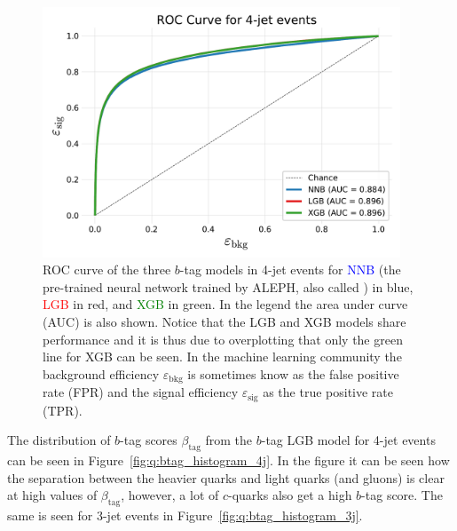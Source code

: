 \begin{figure}[h!]
  \centerfloat
  \includegraphics[width=0.95\textwidth, trim=10 10 10 40, clip]{figures/quarks/ROC_4_jet-down_sample=1.00-ML_vars=vertex-selection=b-ejet_min=4-n_iter_RS_lgb=99-n_iter_RS_xgb=9-cdot_cut=0.90-version=19.pdf}
  \caption[ROC curve for 4-jet $b$-tagging]
          {ROC curve of the three $b$-tag models in 4-jet events for \textcolor{blue}{NNB} (the pre-trained neural network trained by ALEPH, also called ) in blue, \textcolor{red}{LGB} in red, and \textcolor{green}{XGB} in green. In the legend the area under curve (AUC) is also shown. Notice that the LGB and XGB models share performance and it is thus due to overplotting that only the green line for XGB can be seen. In the machine learning community the background efficiency $\varepsilon_\mathrm{bkg}$ is sometimes know as the false positive rate (FPR) and the signal efficiency $\varepsilon_\mathrm{sig}$ as the true positive rate (TPR).  
          } 
  \label{fig:q:roc_btag_4j}
\end{figure}

The distribution of $b$-tag scores $\beta_\mathrm{tag}$ from the $b$-tag LGB model for 4-jet events can be seen in Figure~\ref{fig:q:btag_histogram_4j}. In the figure it can be seen how the separation between the heavier quarks and light quarks (and gluons) is clear at high values of $\beta_\mathrm{tag}$, however, a lot of $c$-quarks also get a high $b$-tag score. The same is seen for 3-jet events in Figure~\ref{fig:q:btag_histogram_3j}. 


